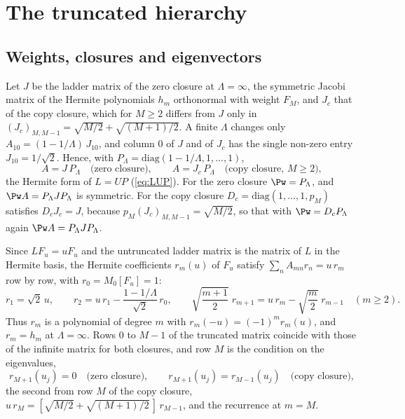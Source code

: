 \section{The truncated hierarchy}\label{app:truncated}

\subsection{Weights, closures and eigenvectors}

Let $J$ be the ladder matrix of the zero closure at $\Lambda=\infty$, the symmetric Jacobi matrix of the Hermite polynomials $h_m$ orthonormal with weight $F_M$, and $J_c$ that of the copy closure, which for $M\ge2$ differs from $J$ only in $(J_c)_{M,M-1}=\sqrt{M/2}+\sqrt{(M+1)/2}$. A finite $\Lambda$ changes only $A_{10}=(1-1/\Lambda)\,J_{10}$, and column $0$ of $J$ and of $J_c$ has the single non-zero entry $J_{10}=1/\sqrt2$. Hence, with $P_\Lambda=\mathrm{diag}(1-1/\Lambda,1,\dots,1)$,
\begin{equation}\label{appC:factor}
  A=J\,P_\Lambda\quad\text{(zero closure)},\qquad A=J_c\,P_\Lambda\quad\text{(copy closure, $M\ge2$)},
\end{equation}
the Hermite form of $L=UP$ (\ref{eq:LUP}). For the zero closure $\Pw=P_\Lambda$, and $\Pw A=P_\Lambda JP_\Lambda$ is symmetric. For the copy closure $D_c=\mathrm{diag}(1,\dots,1,p_M)$ satisfies $D_cJ_c=J$, because $p_M(J_c)_{M,M-1}=\sqrt{M/2}$, so that with $\Pw=D_cP_\Lambda$ again $\Pw A=P_\Lambda JP_\Lambda$.

Since $LF_u=uF_u$ and the untruncated ladder matrix is the matrix of $L$ in the Hermite basis, the Hermite coefficients $r_m(u)$ of $F_u$ satisfy $\sum_nA_{mn}r_n=u\,r_m$ row by row, with $r_0=M_0[F_u]=1$:
\begin{equation}\label{appC:rec}
  r_1=\sqrt2\,u,\qquad r_2=u\,r_1-\frac{1-1/\Lambda}{\sqrt2}\,r_0,\qquad
  \sqrt{\frac{m+1}{2}}\;r_{m+1}=u\,r_m-\sqrt{\frac m2}\;r_{m-1}\quad(m\ge2).
\end{equation}
Thus $r_m$ is a polynomial of degree $m$ with $r_m(-u)=(-1)^mr_m(u)$, and $r_m=h_m$ at $\Lambda=\infty$. Rows $0$ to $M-1$ of the truncated matrix coincide with those of the infinite matrix for both closures, and row $M$ is the condition on the eigenvalues,
\begin{equation}\label{appC:eigcond}
  r_{M+1}(u_j)=0\quad\text{(zero closure)},\qquad r_{M+1}(u_j)=r_{M-1}(u_j)\quad\text{(copy closure)},
\end{equation}
the second from row $M$ of the copy closure, $u\,r_M=[\sqrt{M/2}+\sqrt{(M+1)/2}\,]\,r_{M-1}$, and the recurrence at $m=M$.

